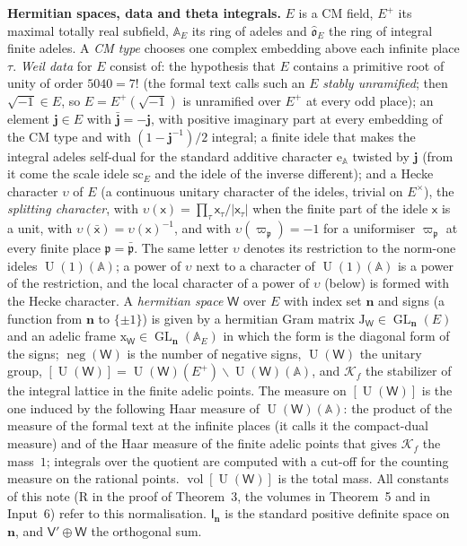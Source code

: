 \documentclass[11pt,a4paper]{article}
\newcommand{\kw}[1]{\emph{#1}}
\newcommand{\subhead}[1]{\par\addvspace{9pt plus 2pt}\Needspace{4\baselineskip}\noindent\textbf{#1}\enspace\ignorespaces}
\theoremstyle{plainx}
\theoremstyle{uprightx}
\newcommand{\bn}{\mathbf{n}}
\newcommand{\sW}{\mathsf{W}}
\newcommand{\sV}{\mathsf{V}}
\newcommand{\sI}{\mathsf{I}}
\newcommand{\fp}{\mathfrak{p}}
\newcommand{\A}{\mathbb{A}}
\newcommand{\GL}{\operatorname{GL}}
\newcommand{\U}{\operatorname{U}}
\newcommand{\negc}{\operatorname{neg}}
\begin{document}
\subhead{Hermitian spaces, data and theta integrals.} $E$ is a CM field, $E^{+}$ its maximal totally real
subfield, $\A_E$ its ring of adeles and $\hat{\mathfrak{o}}_E$ the ring of integral finite adeles. A \kw{CM type}
chooses one complex embedding above each infinite place $\tau$. \kw{Weil data} for $E$ consist of: the
hypothesis that $E$ contains a primitive root of unity of order $5040=7!$ (the formal text calls such an $E$
\emph{stably unramified}; then $\sqrt{-1}\in E$, so $E=E^{+}(\sqrt{-1})$ is unramified over $E^{+}$ at every odd
place); an element $\mathbf{j}\in E$ with $\bar{\mathbf{j}}=-\mathbf{j}$, with positive imaginary part at every embedding of the
CM type and with $(1-\mathbf{j}^{-1})/2$ integral; a finite idele that makes the integral adeles self-dual for the
standard additive character $\mathrm{e}_{\A}$ twisted by $\mathbf{j}$ (from it come the scale idele $\mathrm{sc}_E$ and
the idele of the inverse different); and a Hecke character $\upsilon$ of $E$ (a continuous unitary character of
the ideles, trivial on $E^{\times}$), the \kw{splitting character}, with
$\upsilon(\mathsf{x})=\prod_\tau\mathsf{x}_\tau/|\mathsf{x}_\tau|$ when the finite part of the idele $\mathsf{x}$ is a
unit, with $\upsilon(\bar{\mathsf{x}})=\upsilon(\mathsf{x})^{-1}$, and with $\upsilon(\varpi_{\fp})=-1$ for a
uniformiser $\varpi_{\fp}$ at every finite place $\fp=\bar{\fp}$. The same letter $\upsilon$ denotes its
restriction to the norm-one ideles $\U(1)(\A)$; a power of $\upsilon$ next to a character of $\U(1)(\A)$ is a
power of the restriction, and the local character of a power of $\upsilon$ (below) is formed with the Hecke
character. A
\kw{hermitian space} $\sW$ over $E$ with index set $\bn$ and signs (a function from $\bn$ to $\{\pm1\}$) is given by a hermitian
Gram matrix $\mathrm{J}_{\sW}\in\GL_{\bn}(E)$ and an adelic frame $\mathrm{x}_{\sW}\in\GL_{\bn}(\A_E)$ in which the form is the
diagonal form of the signs; $\negc(\sW)$ is the number of negative signs, $\U(\sW)$ the unitary group,
$[\U(\sW)]=\U(\sW)(E^{+})\backslash\U(\sW)(\A)$, and $\mathcal{K}_f$ the stabilizer of the integral lattice in the
finite adelic points. The measure on $[\U(\sW)]$ is the one induced by the following Haar measure of
$\U(\sW)(\A)$: the product of the measure of the formal text at the infinite places (it calls it the compact-dual
measure) and of the Haar measure of the finite adelic points that gives $\mathcal{K}_f$ the mass~$1$; integrals over
the quotient are computed with a cut-off for the counting measure on the rational points.
$\operatorname{vol}[\U(\sW)]$ is the total mass. All constants of this note ($\mathrm{R}$ in the proof of
Theorem~3, the volumes in Theorem~5 and in Input~6) refer to this normalisation. $\sI_{\bn}$ is the standard positive definite space on $\bn$, and
$\sV'\oplus\sW$ the orthogonal sum.
\end{document}
